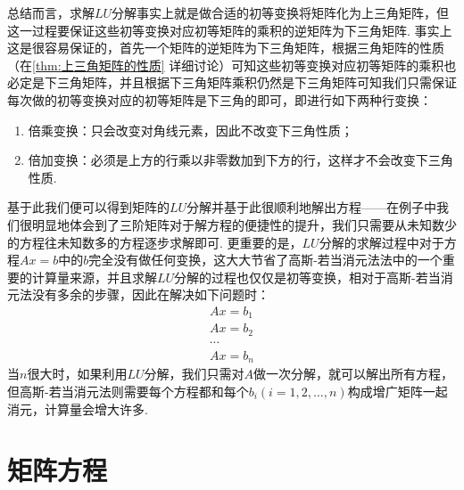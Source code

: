 总结而言，求解$LU$分解事实上就是做合适的初等变换将矩阵化为上三角矩阵，但这一过程要保证这些初等变换对应初等矩阵的乘积的逆矩阵为下三角矩阵. 事实上这是很容易保证的，首先一个矩阵的逆矩阵为下三角矩阵，根据三角矩阵的性质（在\autoref{thm:上三角矩阵的性质} 详细讨论）可知这些初等变换对应初等矩阵的乘积也必定是下三角矩阵，并且根据下三角矩阵乘积仍然是下三角矩阵可知我们只需保证每次做的初等变换对应的初等矩阵是下三角的即可，即进行如下两种行变换：
\begin{enumerate}
    \item 倍乘变换：只会改变对角线元素，因此不改变下三角性质；
    \item 倍加变换：必须是上方的行乘以非零数加到下方的行，这样才不会改变下三角性质.
\end{enumerate}
基于此我们便可以得到矩阵的$LU$分解并基于此很顺利地解出方程——在例子中我们很明显地体会到了三阶矩阵对于解方程的便捷性的提升，我们只需要从未知数少的方程往未知数多的方程逐步求解即可. 更重要的是，$LU$分解的求解过程中对于方程$Ax=b$中的$b$完全没有做任何变换，这大大节省了高斯-若当消元法法中的一个重要的计算量来源，并且求解$LU$分解的过程也仅仅是初等变换，相对于高斯-若当消元法没有多余的步骤，因此在解决如下问题时：
\begin{gather*}
    Ax=b_1 \\ Ax=b_2 \\ \cdots \\ Ax=b_n
\end{gather*}
当$n$很大时，如果利用$LU$分解，我们只需对$A$做一次分解，就可以解出所有方程，但高斯-若当消元法则需要每个方程都和每个$b_i(i=1,2,\ldots,n)$构成增广矩阵一起消元，计算量会增大许多.

\section{矩阵方程}

